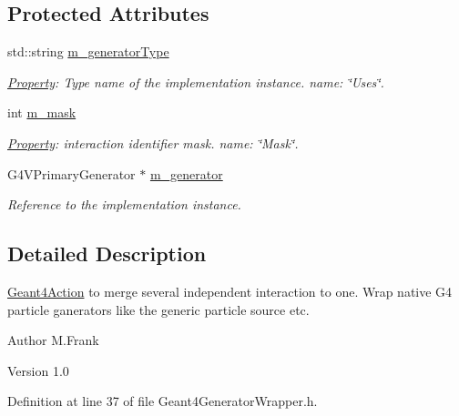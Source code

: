 \subsection*{Protected Attributes}
\begin{DoxyCompactItemize}
\item 
std::string \hyperlink{class_d_d4hep_1_1_simulation_1_1_geant4_generator_wrapper_aa1ee2aa3cf2f158fe49c786af37b46f0}{m\_\-generatorType}
\begin{DoxyCompactList}\small\item\em \hyperlink{class_d_d4hep_1_1_property}{Property}: Type name of the implementation instance. name: \char`\"{}Uses\char`\"{}. \item\end{DoxyCompactList}\item 
int \hyperlink{class_d_d4hep_1_1_simulation_1_1_geant4_generator_wrapper_a92bb07f3c2f7c34dc8f55290716c64b1}{m\_\-mask}
\begin{DoxyCompactList}\small\item\em \hyperlink{class_d_d4hep_1_1_property}{Property}: interaction identifier mask. name: \char`\"{}Mask\char`\"{}. \item\end{DoxyCompactList}\item 
G4VPrimaryGenerator $\ast$ \hyperlink{class_d_d4hep_1_1_simulation_1_1_geant4_generator_wrapper_a53d604d0f487a3be2edbe9670d0d4f15}{m\_\-generator}
\begin{DoxyCompactList}\small\item\em Reference to the implementation instance. \item\end{DoxyCompactList}\end{DoxyCompactItemize}


\subsection{Detailed Description}
\hyperlink{class_d_d4hep_1_1_simulation_1_1_geant4_action}{Geant4Action} to merge several independent interaction to one. Wrap native G4 particle ganerators like the generic particle source etc.

\begin{DoxyAuthor}{Author}
M.Frank 
\end{DoxyAuthor}
\begin{DoxyVersion}{Version}
1.0 
\end{DoxyVersion}


Definition at line 37 of file Geant4GeneratorWrapper.h.

